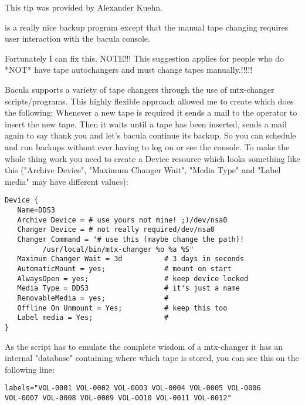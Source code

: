 This tip was provided by Alexander Kuehn. 

 is a really nice backup program except
that the manual tape changing requires user interaction with the bacula
console. 

Fortunately I can fix this.
NOTE!!! This suggestion applies for people who do *NOT* have tape autochangers
and must change tapes manually.!!!!! 

Bacula supports a variety of tape changers through the use of mtx-changer
scripts/programs. This highly flexible approach allowed me to create 
 which does the following:
Whenever a new tape is required it sends a mail to the operator to insert the
new tape. Then it waits until a tape has been inserted, sends a mail again to
say thank you and let's bacula continue its backup.
So you can schedule and run backups without ever having to log on or see the
console.
To make the whole thing work you need to create a Device resource which looks
something like this ("Archive Device", "Maximum Changer Wait", "Media
Type" and "Label media" may have different values): 

\footnotesize
\begin{verbatim}
Device {
   Name=DDS3
   Archive Device = # use yours not mine! ;)/dev/nsa0
   Changer Device = # not really required/dev/nsa0
   Changer Command = "# use this (maybe change the path)!
         /usr/local/bin/mtx-changer %o %a %S"
   Maximum Changer Wait = 3d          # 3 days in seconds
   AutomaticMount = yes;              # mount on start
   AlwaysOpen = yes;                  # keep device locked
   Media Type = DDS3                  # it's just a name
   RemovableMedia = yes;              #
   Offline On Unmount = Yes;          # keep this too
   Label media = Yes;                 #
}
\end{verbatim}
\normalsize

As the script has to emulate the complete wisdom of a mtx-changer it has an
internal "database" containing where which tape is stored, you can see this on
the following line:

\footnotesize
\begin{verbatim}
labels="VOL-0001 VOL-0002 VOL-0003 VOL-0004 VOL-0005 VOL-0006
VOL-0007 VOL-0008 VOL-0009 VOL-0010 VOL-0011 VOL-0012"
\end{verbatim}
\normalsize

